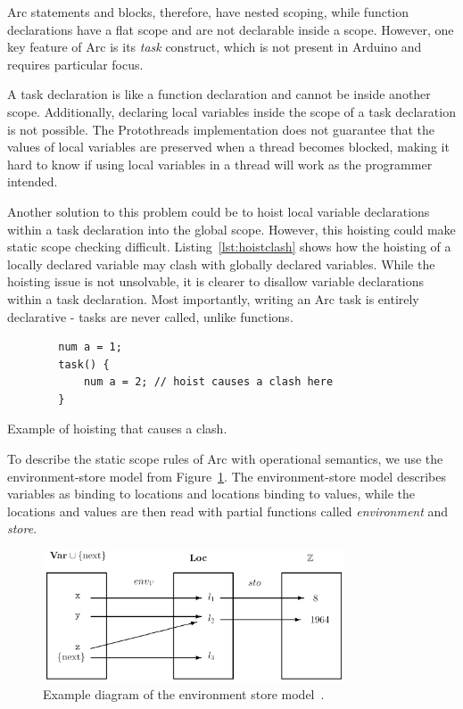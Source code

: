 Arc statements and blocks, therefore, have nested scoping, while function declarations have a flat scope and are not declarable inside a scope. However, one key feature of Arc is its \textit{task} construct, which is not present in Arduino and requires particular focus.

A task declaration is like a function declaration and cannot be inside another scope. Additionally, declaring local variables inside the scope of a task declaration is not possible. The Protothreads implementation does not guarantee that the values of local variables are preserved when a thread becomes blocked, making it hard to know if using local variables in a thread will work as the programmer intended.

Another solution to this problem could be to hoist local variable declarations within a task declaration into the global scope. However, this hoisting could make static scope checking difficult. Listing~\ref{lst:hoistclash} shows how the hoisting of a locally declared variable may clash with globally declared variables. While the hoisting issue is not unsolvable, it is clearer to disallow variable declarations within a task declaration. Most importantly, writing an Arc task is entirely declarative - tasks are never called, unlike functions.


\begin{listing}[htb!]
    \begin{verbatim}
        num a = 1;
        task() {
            num a = 2; // hoist causes a clash here
        }
    \end{verbatim}
    \caption{Example of hoisting that causes a clash.}
    \label{lst:hoistclash}
\end{listing}


To describe the static scope rules of Arc with operational semantics, we use the environment-store model from Figure~\ref{fig:envstomodel}. The environment-store model describes variables as binding to locations and locations binding to values, while the locations and values are then read with partial functions called \textit{environment} and \textit{store}.


\begin{figure}[htb!]
    \centering
    \includegraphics[width=0.8\textwidth]{figures/Environment_Store.png}
    \caption{Example diagram of the environment store model~\cite{Huttel2010}.}
    \label{fig:envstomodel}
\end{figure}


